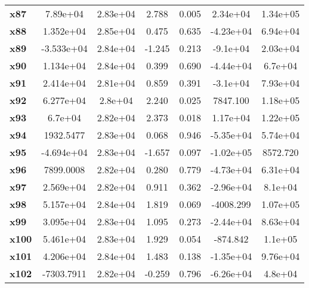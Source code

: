 \documentclass{article}
\begin{document}
\begin{center}
{\begin{tabular}{lcccccc}
\textbf{x87}   &     7.89e+04  &     2.83e+04     &     2.788  &         0.005        &     2.34e+04    &     1.34e+05     \\
\textbf{x88}   &    1.352e+04  &     2.85e+04     &     0.475  &         0.635        &    -4.23e+04    &     6.94e+04     \\
\textbf{x89}   &   -3.533e+04  &     2.84e+04     &    -1.245  &         0.213        &     -9.1e+04    &     2.03e+04     \\
\textbf{x90}   &    1.134e+04  &     2.84e+04     &     0.399  &         0.690        &    -4.44e+04    &      6.7e+04     \\
\textbf{x91}   &    2.414e+04  &     2.81e+04     &     0.859  &         0.391        &     -3.1e+04    &     7.93e+04     \\
\textbf{x92}   &    6.277e+04  &      2.8e+04     &     2.240  &         0.025        &     7847.100    &     1.18e+05     \\
\textbf{x93}   &      6.7e+04  &     2.82e+04     &     2.373  &         0.018        &     1.17e+04    &     1.22e+05     \\
\textbf{x94}   &    1932.5477  &     2.83e+04     &     0.068  &         0.946        &    -5.35e+04    &     5.74e+04     \\
\textbf{x95}   &   -4.694e+04  &     2.83e+04     &    -1.657  &         0.097        &    -1.02e+05    &     8572.720     \\
\textbf{x96}   &    7899.0008  &     2.82e+04     &     0.280  &         0.779        &    -4.73e+04    &     6.31e+04     \\
\textbf{x97}   &    2.569e+04  &     2.82e+04     &     0.911  &         0.362        &    -2.96e+04    &      8.1e+04     \\
\textbf{x98}   &    5.157e+04  &     2.84e+04     &     1.819  &         0.069        &    -4008.299    &     1.07e+05     \\
\textbf{x99}   &    3.095e+04  &     2.83e+04     &     1.095  &         0.273        &    -2.44e+04    &     8.63e+04     \\
\textbf{x100}  &    5.461e+04  &     2.83e+04     &     1.929  &         0.054        &     -874.842    &      1.1e+05     \\
\textbf{x101}  &    4.206e+04  &     2.84e+04     &     1.483  &         0.138        &    -1.35e+04    &     9.76e+04     \\
\textbf{x102}  &   -7303.7911  &     2.82e+04     &    -0.259  &         0.796        &    -6.26e+04    &      4.8e+04     \\

\end{tabular}}
\end{center}
\end{document}
